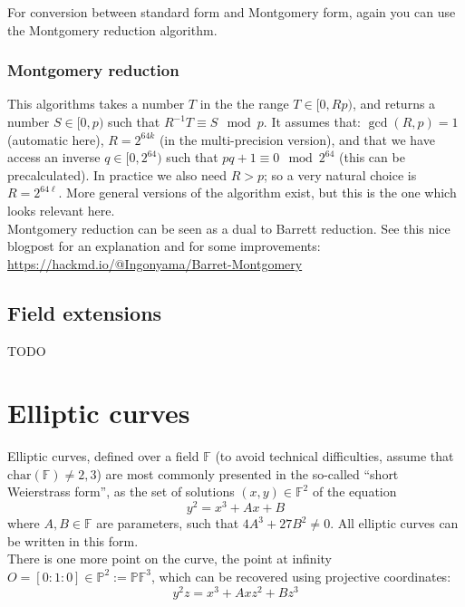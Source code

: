 \documentclass[12pt,draft,a4paper,openany,oneside]{amsbook}
\def\F{\mathbb{F}}
\def\P{\mathbb{P}}
\theoremstyle{plain}
\theoremstyle{definition}
\begin{document}
For conversion between standard form and Montgomery form, again you can use
the Montgomery reduction algorithm.\\

\subsection{Montgomery reduction}
This algorithms takes a number $T$ in the the range $T\in[0,Rp)$, and returns
a number $S\in[0,p)$ such that $R^{-1}T\equiv S \mod p$. It assumes that:
$\gcd(R,p)=1$ (automatic here), $R=2^{64k}$ (in the multi-precision version), and that we have access
an inverse $q\in[0,2^{64})$ such that $pq + 1 \equiv 0\mod 2^{64}$ (this can be precalculated).
In practice we also need $R>p$; so a very natural choice is $R=2^{64\ell}$.
More general versions of the algorithm exist, but this is the one which looks
relevant here.\\

Montgomery reduction can be seen as a dual to Barrett reduction.
See this nice blogpost for an explanation and for some improvements:
\url{https://hackmd.io/@Ingonyama/Barret-Montgomery}


\section{Field extensions}

TODO


\chapter{Elliptic curves}

Elliptic curves, defined over a field $\F$ (to avoid technical difficulties, assume that $\mathrm{char}(\F)\neq 2,3$)
are most commonly presented in the so-called ``short Weierstrass form'',
as the set of solutions $(x,y)\in\F^2$ of the equation
\[ y^2 = x^3 + Ax + B \]
where $A,B\in\F$ are parameters, such that $4 A^3 + 27 B^2 \neq 0$. 
All elliptic curves can be written in this form.\\

There is one more point on the curve, the point at infinity $O=[0:1:0]\in\P^2:=\P\F^3$,
which can be recovered using projective coordinates:
\[ y^2z = x^3 + Axz^2 + Bz^3 \]
\end{document}
